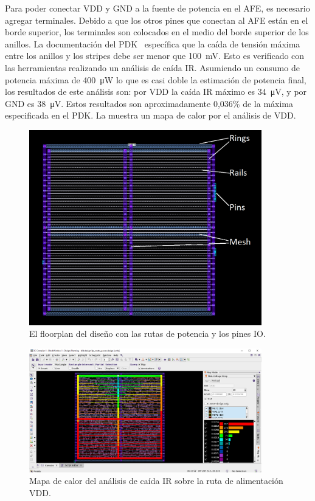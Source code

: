 \documentclass[a4paper, twoside, 11pt]{report}
\begin{document}
Para poder conectar VDD y GND a la fuente de potencia en el AFE, es necesario agregar terminales. Debido a que los otros pines que conectan al AFE están en el borde superior, los terminales son colocados en el medio del borde superior de los anillos. La documentación del PDK~\cite{dig_imp_guidelines} específica que la caída de tensión máxima entre los anillos y los stripes debe ser menor que \SI{100}{\milli\volt}. Esto es verificado con las herramientas realizando un análisis de caída IR. Asumiendo un consumo de potencia máxima de \SI{400}{\micro\watt} lo que es casi doble la estimación de potencia final, los resultados de este análisis son: por VDD la caída IR máximo es \SI{34}{\micro\volt}, y por GND es \SI{38}{\micro\volt}. Estos resultados son aproximadamente 0,036\% de la máxima especificada en el PDK. La  muestra un mapa de calor por el análisis de VDD.

\begin{figure}[htb]
  \centering
  \includegraphics[width=0.9\textwidth]{./img/floorplan}
  \caption{El floorplan del diseño con las rutas de potencia y los pines IO.}
  \label{fig:floorplan_pg}
\end{figure}

\begin{figure}[htb]
  \centering
  \includegraphics[width=0.9\textwidth]{./img/dp_create_power_ir_drop}
  \caption{Mapa de calor del análisis de caída IR sobre la ruta de alimentación VDD.}
  \label{fig:ir_drop}
\end{figure}
\end{document}
